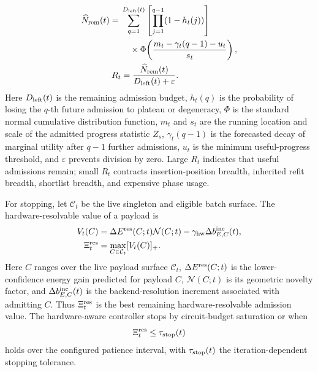 \documentclass[
  reprint,
  amsmath,
  amssymb,
  aps,
  pra,
  nofootinbib,
  superscriptaddress,
  floatfix
]{revtex4-2}
\newcommand{\eps}{\varepsilon}
\begin{document}
\begin{equation}
\begin{aligned}
\widehat N_{\rm rem}(t)
={}&
\sum_{q=1}^{D_{\rm left}(t)}
\left[\prod_{j=1}^{q-1}(1-h_t(j))\right]
\\
&\quad\times
\Phi\!\left(\frac{m_t-\gamma_t(q-1)-u_t}{s_t}\right),
\\
R_t&=\frac{\widehat N_{\rm rem}(t)}{D_{\rm left}(t)+\eps} .
\end{aligned}
\label{eq:expected_utility_left}
\end{equation}
Here \(D_{\rm left}(t)\) is the remaining admission budget, \(h_t(q)\) is the probability of losing the \(q\)-th future admission to plateau or degeneracy, \(\Phi\) is the standard normal cumulative distribution function, \(m_t\) and \(s_t\) are the running location and scale of the admitted progress statistic \(Z_s\), \(\gamma_t(q-1)\) is the forecasted decay of marginal utility after \(q-1\) further admissions, \(u_t\) is the minimum useful-progress threshold, and \(\eps\) prevents division by zero. Large $R_t$ indicates that useful admissions remain; small $R_t$ contracts insertion-position breadth, inherited refit breadth, shortlist breadth, and expensive phase usage.

For stopping, let $\mathcal C_t$ be the live singleton and eligible batch surface.  The hardware-resolvable value of a payload is
\begin{equation}
\begin{aligned}
V_t(C)&=
\Delta E^{\rm res}(C;t)\mathcal N(C;t)
-\gamma_{\rm hw}\Delta b_{E,C}^{\rm inc}(t),
\\
\Xi_t^{\rm res}&=\max_{C\in\mathcal C_t}[V_t(C)]_+ .
\end{aligned}
\label{eq:appendix_stopping_residual}
\end{equation}
Here \(C\) ranges over the live payload surface \(\mathcal C_t\), \(\Delta E^{\rm res}(C;t)\) is the lower-confidence energy gain predicted for payload \(C\), \(\mathcal N(C;t)\) is its geometric novelty factor, and \(\Delta b_{E,C}^{\rm inc}(t)\) is the backend-resolution increment associated with admitting \(C\). Thus \(\Xi_t^{\rm res}\) is the best remaining hardware-resolvable admission value.
The hardware-aware controller stops by circuit-budget saturation or when
\begin{equation}
\Xi_t^{\rm res}\le\tau_{\rm stop}(t)
\label{eq:appendix_stop_rule}
\end{equation}
holds over the configured patience interval, with \(\tau_{\rm stop}(t)\) the iteration-dependent stopping tolerance.
\end{document}
